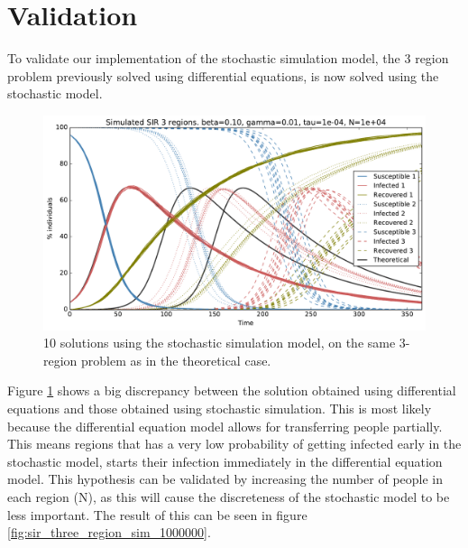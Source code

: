 \section{Validation}

To validate our implementation of the stochastic simulation model, the 3 region problem previously solved using differential equations, is now solved using the stochastic model.

\begin{figure}[H]
	\centering
	\includegraphics[width= 1.0 \linewidth]{plots/sir_three_region_sim_10000.pdf}
	\caption{10 solutions using the stochastic simulation model, on the same 3-region problem as in the theoretical case.}
	\label{fig:sir_three_region_sim_10000}
\end{figure}

Figure \ref{fig:sir_three_region_sim_10000} shows a big discrepancy between the solution obtained using differential equations and those obtained using stochastic simulation. This is most likely because the differential equation model allows for transferring people partially. This means regions that has a very low probability of getting infected early in the stochastic model, starts their infection immediately in the differential equation model. This hypothesis can be validated by increasing the number of people in each region (N), as this will cause the discreteness of the stochastic model to be less important. The result of this can be seen in figure \ref{fig:sir_three_region_sim_1000000}. 

